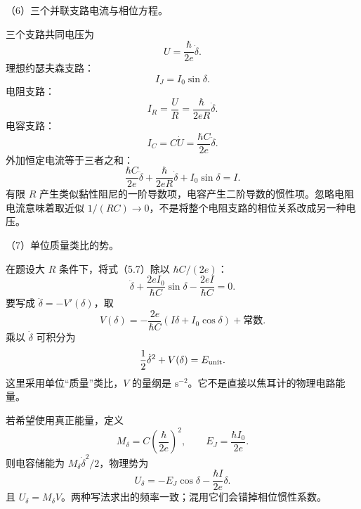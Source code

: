 \documentclass[12pt,a4paper,fontset=fandol]{ctexart}
\begin{document}
（6）三个并联支路电流与相位方程。

三个支路共同电压为 \[
U=\frac{\hbar}{2e}\dot\delta.
\] 理想约瑟夫森支路： \[
I_J=I_0\sin\delta.
\] 电阻支路： \[
I_R=\frac UR=\frac{\hbar}{2eR}\dot\delta.
\] 电容支路： \[
I_C=C\dot U=\frac{\hbar C}{2e}\ddot\delta.
\] 外加恒定电流等于三者之和： \[
\boxed{
\frac{\hbar C}{2e}\ddot\delta
+\frac{\hbar}{2eR}\dot\delta
+I_0\sin\delta=I.}\tag{5.7}
\] 有限 \(R\)
产生类似黏性阻尼的一阶导数项，电容产生二阶导数的惯性项。忽略电阻电流意味着取近似
\(1/(RC)\to0\)，不是将整个电阻支路的相位关系改成另一种电压。

（7）单位质量类比的势。

在题设大 \(R\) 条件下，将式（5.7）除以 \(\hbar C/(2e)\)： \[
\ddot\delta+\frac{2eI_0}{\hbar C}\sin\delta
-\frac{2eI}{\hbar C}=0.
\] 要写成 \(\ddot\delta=-V'(\delta)\)，取 \[
\boxed{V(\delta)=
-\frac{2e}{\hbar C}(I\delta+I_0\cos\delta)+\text{常数}.}\tag{5.8}
\] 乘以 \(\dot\delta\) 可积分为 \[
\frac12\dot\delta^2+V(\delta)=E_{\rm unit}.
\] 这里采用单位``质量''类比，\(V\) 的量纲是
\(\mathrm{s^{-2}}\)。它不是直接以焦耳计的物理电路能量。

若希望使用真正能量，定义 \[
M_\delta=C\left(\frac{\hbar}{2e}\right)^2,\qquad
E_J=\frac{\hbar I_0}{2e}.
\] 则电容储能为 \(M_\delta\dot\delta^2/2\)，物理势为 \[
U_\delta=-E_J\cos\delta-\frac{\hbar I}{2e}\delta.
\] 且
\(U_\delta=M_\delta V\)。两种写法求出的频率一致；混用它们会错掉相位惯性系数。

\begin{center}
\begin{minipage}{\linewidth}
\centering\begingroup
{}
\ifdim\wd\diagrambox>.88\linewidth
\sbox{\diagrambox}{\resizebox{.88\linewidth}{!}{\usebox{\diagrambox}}}
\fi
\ifdim\ht\diagrambox>.40\textheight
\resizebox{!}{.40\textheight}{\usebox{\diagrambox}}
\else\usebox{\diagrambox}\fi
\par{}
\endgroup\end{minipage}
\end{center}
\end{document}
